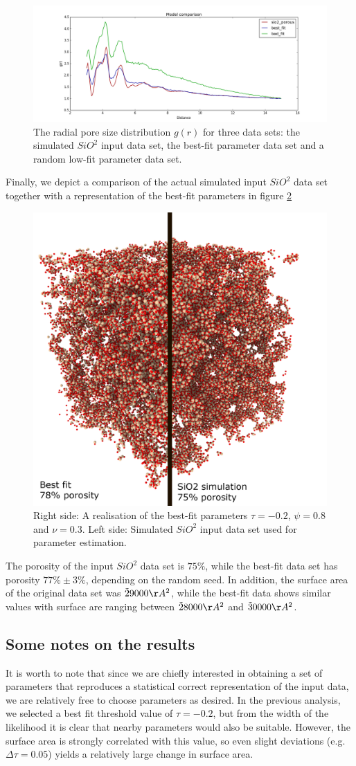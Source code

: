 \documentclass[aps,pre,twocolumn,letterpaper,floatfix,showpacs]{revtex4}
\begin{document}
\begin{figure}
\includegraphics[width=.55\textwidth]{gofr_plot.png}
\caption{The radial pore size distribution $g(r)$ for three data sets: the simulated $SiO^2$ input data set, the best-fit parameter data set and a random low-fit parameter data set. }
\label{fig:gofr1}
\end{figure}
Finally, we depict a comparison of the actual simulated input $SiO^2$ data set together with a representation of the best-fit parameters in figure \ref{fig:porous_vs_model}   
\begin{figure}
\includegraphics[width=.45\textwidth]{comparison.png}
\caption{Right side: A realisation of the best-fit parameters $\tau=-0.2$, $\psi=0.8$ and $\nu=0.3$. Left side: Simulated $SiO^2$ input data set used for parameter estimation. }
\label{fig:porous_vs_model}
\end{figure}

The porosity of the input $SiO^2$ data set is $75\%$, while the best-fit data set has porosity $77\% \pm 3 \%$, depending on the random seed. In addition, the surface area of the original data set was $\tilde 29 000 \AA^2$, while the best-fit data shows similar values with surface are ranging between $\tilde 28 000 \AA^2$ and $\tilde 30 000 \AA^2$.

\subsection{Some notes on the results}
It is worth to note that since we are chiefly interested in obtaining a set of parameters that reproduces a statistical correct representation of the input data, we are relatively free to choose parameters as desired. In the previous analysis, we selected a best fit threshold value of $\tau=-0.2$, but from the width of the likelihood it is clear that nearby parameters would also be suitable. However, the surface area is strongly correlated with this value, so even slight deviations (e.g. $\Delta \tau = 0.05$) yields a relatively large change in surface area. 
\end{document}
